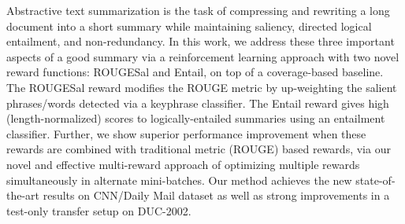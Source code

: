 Abstractive text summarization is the task of compressing and rewriting a long document into a short summary while maintaining saliency, directed logical entailment, and non-redundancy. In this work, we address these three important aspects of a good summary via a reinforcement learning approach with two novel reward functions: ROUGESal and Entail, on top of a coverage-based baseline. The ROUGESal reward modifies the ROUGE metric by up-weighting the salient phrases/words detected via a keyphrase classifier. The Entail reward gives high (length-normalized) scores to logically-entailed summaries using an entailment classifier. Further, we show superior performance improvement when these rewards are combined with traditional metric (ROUGE) based rewards, via our novel and effective multi-reward approach of optimizing multiple rewards simultaneously in alternate mini-batches. Our method achieves the new state-of-the-art results on CNN/Daily Mail dataset as well as strong improvements in a test-only transfer setup on DUC-2002.
